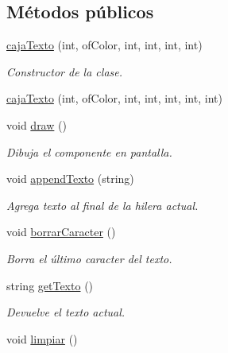 \subsection*{Métodos públicos}
\begin{DoxyCompactItemize}
\item 
\hyperlink{classcaja_texto_aee455629d334f28613f43b6a61d16f14}{caja\+Texto} (int, of\+Color, int, int, int, int)
\begin{DoxyCompactList}\small\item\em Constructor de la clase. \end{DoxyCompactList}\item 
\hyperlink{classcaja_texto_a66c1f439ba50e8df9a13eb5a53085c52}{caja\+Texto} (int, of\+Color, int, int, int, int, int)
\item 
void \hyperlink{classcaja_texto_a5bc02d7f55e12fd32715e4509853a558}{draw} ()
\begin{DoxyCompactList}\small\item\em Dibuja el componente en pantalla. \end{DoxyCompactList}\item 
void \hyperlink{classcaja_texto_ae6326da3ec5842eb0ff41208d22b1567}{append\+Texto} (string)
\begin{DoxyCompactList}\small\item\em Agrega texto al final de la hilera actual. \end{DoxyCompactList}\item 
void \hyperlink{classcaja_texto_ab9362a01f444db0bed5032b9ec585905}{borrar\+Caracter} ()
\begin{DoxyCompactList}\small\item\em Borra el último caracter del texto. \end{DoxyCompactList}\item 
string \hyperlink{classcaja_texto_ab5e4ed49e9aaa7176e9186b085a07621}{get\+Texto} ()
\begin{DoxyCompactList}\small\item\em Devuelve el texto actual. \end{DoxyCompactList}\item 
void \hyperlink{classcaja_texto_a088cc70dc707de2cf00bed4f906521c0}{limpiar} ()
\end{DoxyCompactItemize}
